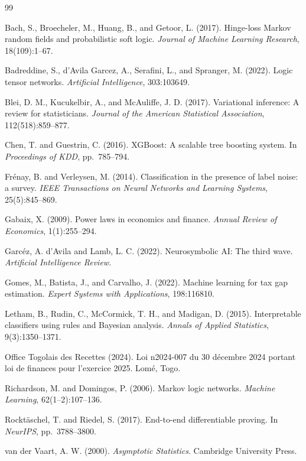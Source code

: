 \documentclass[letterpaper]{article}
\begin{document}
\begin{thebibliography}{99}

Bach, S., Broecheler, M., Huang, B., and Getoor, L. (2017).
Hinge-loss Markov random fields and probabilistic soft logic.
\textit{Journal of Machine Learning Research}, 18(109):1--67.

Badreddine, S., d'Avila Garcez, A., Serafini, L., and Spranger, M. (2022).
Logic tensor networks.
\textit{Artificial Intelligence}, 303:103649.

Blei, D. M., Kucukelbir, A., and McAuliffe, J. D. (2017).
Variational inference: A review for statisticians.
\textit{Journal of the American Statistical Association}, 112(518):859--877.

Chen, T. and Guestrin, C. (2016).
{XGBoost}: A scalable tree boosting system.
In \textit{Proceedings of KDD}, pp.\ 785--794.

Fr{\'e}nay, B. and Verleysen, M. (2014).
Classification in the presence of label noise: a survey.
\textit{IEEE Transactions on Neural Networks and Learning Systems},
25(5):845--869.

Gabaix, X. (2009).
Power laws in economics and finance.
\textit{Annual Review of Economics}, 1(1):255--294.

Garc{\'e}z, A. d'Avila and Lamb, L. C. (2022).
Neurosymbolic AI: The third wave.
\textit{Artificial Intelligence Review}.

Gomes, M., Batista, J., and Carvalho, J. (2022).
Machine learning for tax gap estimation.
\textit{Expert Systems with Applications}, 198:116810.

Letham, B., Rudin, C., McCormick, T. H., and Madigan, D. (2015).
Interpretable classifiers using rules and Bayesian analysis.
\textit{Annals of Applied Statistics}, 9(3):1350--1371.

Office Togolais des Recettes (2024).
Loi n\textdegree{}2024-007 du 30 d\'ecembre 2024 portant loi de finances
pour l'exercice 2025. Lom\'e, Togo.

Richardson, M. and Domingos, P. (2006).
Markov logic networks.
\textit{Machine Learning}, 62(1--2):107--136.

Rockt{\"a}schel, T. and Riedel, S. (2017).
End-to-end differentiable proving.
In \textit{NeurIPS}, pp.\ 3788--3800.

van der Vaart, A. W. (2000).
\textit{Asymptotic Statistics}.
Cambridge University Press.

\end{thebibliography}
\end{document}
